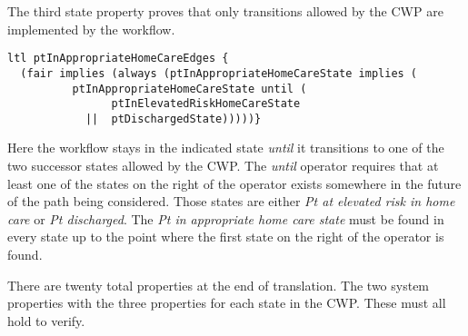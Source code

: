 The third state property proves that only transitions allowed by the CWP are implemented by the workflow.
%
{\small
\begin{lstlisting}[style=myPromela]
ltl ptInAppropriateHomeCareEdges {
  (fair implies (always (ptInAppropriateHomeCareState implies (
          ptInAppropriateHomeCareState until (
                ptInElevatedRiskHomeCareState
            ||  ptDischargedState)))))}
\end{lstlisting}
}
%
\noindent Here the workflow stays in the indicated state \emph{until} it transitions to one of the two successor states allowed by the CWP.  The \emph{until} operator requires that at least one of the states on the right of the operator exists somewhere in the future of the path being considered. Those states are either \emph{Pt at elevated risk in home care} or \emph{Pt discharged}. The \emph{Pt in appropriate home care state} must be found in every state up to the point where the first state on the right of the operator is found. 

There are twenty total properties at the end of translation. The two system properties with the three properties for each state in the CWP. These must all hold to verify.

